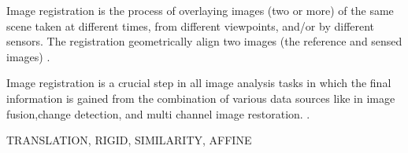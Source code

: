 Image registration is the process of overlaying images (two or more) of the same scene taken at different times, from different viewpoints, and/or by different sensors. The registration geometrically align two images (the reference and sensed images) \cite{zitova2003image}.


Image registration  is  a  crucial  step  in  all  image  analysis  tasks in   which   the   final   information   is   gained   from   the combination of various  data  sources  like in image  fusion,change   detection,   and   multi channel   image   restoration. \cite{zitova2003image}.


TRANSLATION, RIGID, SIMILARITY, AFFINE